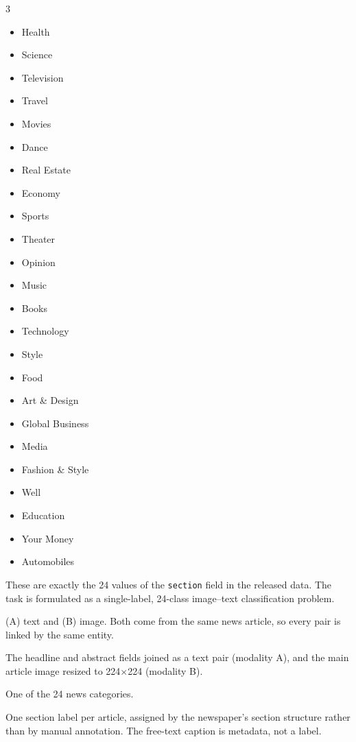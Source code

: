 \documentclass[11pt,a4paper]{article}
\begin{document}
\begin{multicols}{3}
\begin{itemize}[leftmargin=1.5em]
\item Health
\item Science
\item Television
\item Travel
\item Movies
\item Dance
\item Real Estate
\item Economy
\item Sports
\item Theater
\item Opinion
\item Music
\item Books
\item Technology
\item Style
\item Food
\item Art \& Design
\item Global Business
\item Media
\item Fashion \& Style
\item Well
\item Education
\item Your Money
\item Automobiles
\end{itemize}
\end{multicols}

These are exactly the 24 values of the \texttt{section} field in the released data. The task is formulated as a single-label, 24-class image--text classification problem.

\begin{description}[leftmargin=0pt,itemsep=1pt]
\item[Modalities:] (A) text and (B) image. Both come from the same news article, so every pair is linked by the same entity.
\item[Input:] The headline and abstract fields joined as a text pair (modality A), and the main article image resized to 224$\times$224 (modality B).
\item[Output:] One of the 24 news categories.
\item[Annotation type:] One section label per article, assigned by the newspaper's section structure rather than by manual annotation. The free-text caption is metadata, not a label.
\end{description}
\end{document}
